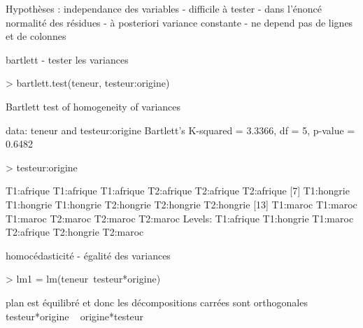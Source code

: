 \documentclass{article}
\begin{document}
Hypothèses :  independance des variables - difficile à tester - dans l'énoncé
              normalité des résidues - à posteriori
              variance constante - ne depend pas de lignes et de colonnes
              
bartlett - tester les variances
\begin{Schunk}
\begin{Sinput}
> bartlett.test(teneur, testeur:origine)
\end{Sinput}
\begin{Soutput}
	Bartlett test of homogeneity of variances

data:  teneur and testeur:origine
Bartlett's K-squared = 3.3366, df = 5, p-value = 0.6482
\end{Soutput}
\begin{Sinput}
> testeur:origine
\end{Sinput}
\begin{Soutput}
 [1] T1:afrique T1:afrique T1:afrique T2:afrique T2:afrique T2:afrique
 [7] T1:hongrie T1:hongrie T1:hongrie T2:hongrie T2:hongrie T2:hongrie
[13] T1:maroc   T1:maroc   T1:maroc   T2:maroc   T2:maroc   T2:maroc  
Levels: T1:afrique T1:hongrie T1:maroc T2:afrique T2:hongrie T2:maroc
\end{Soutput}
\end{Schunk}
homocédasticité - égalité des variances

\begin{Schunk}
\begin{Sinput}
> lm1 = lm(teneur~testeur*origine)
\end{Sinput}
\end{Schunk}
plan est équilibré et donc les décompositions carrées sont orthogonales
testeur*origine ~ origine*testeur
\end{document}
